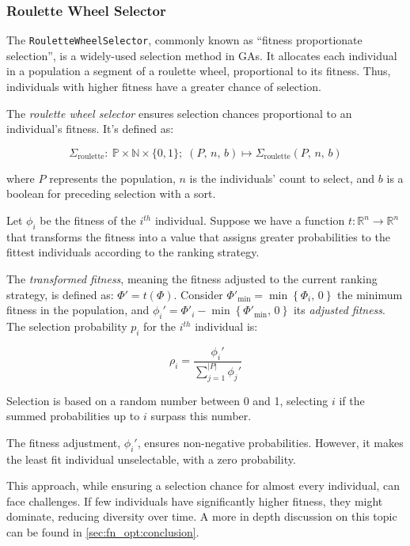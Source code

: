 \subsubsection{Roulette Wheel Selector}
\label{sec:keen:op:select:roulette}
  The \texttt{RouletteWheelSelector}, commonly known as \enquote{fitness 
  proportionate selection}, is a widely-used selection method in GAs.
  It allocates each individual in a population a segment of a roulette wheel, 
  proportional to its fitness.
  Thus, individuals with higher fitness have a greater chance of selection.

  \begin{definition}
    The \emph{roulette wheel selector} ensures selection chances proportional to 
    an individual's fitness.
    It's defined as:

    \begin{equation}
      \Sigma_\mathrm{roulette} :\:
        \mathbb{P} \times \mathbb{N} \times \{0, 1\};\;
      (P,\, n,\, b) \mapsto \Sigma_\mathrm{roulette}(P,\, n,\, b)
    \end{equation}

    where \(P\) represents the population, \(n\) is the individuals' count to 
    select, and \(b\) is a boolean for preceding selection with a sort.

    Let \(\phi_i\) be the fitness of the \(i^{th}\) individual.
    Suppose we have a function \(t : \mathbb{R}^n \to \mathbb{R}^n\) that 
    transforms the fitness into a value that assigns greater probabilities to 
    the fittest individuals according to the ranking strategy.

    The \textit{transformed fitness}, meaning the fitness adjusted to the
    current ranking strategy, is defined as: \(\Phi' = t(\Phi)\).
    Consider \(\Phi'_\mathrm{min} = \min\left\{\Phi_i,\, 0\right\}\) the minimum
    fitness in the population, and \(\phi_i' =  
    \Phi'_i - \min\left\{\Phi'_\mathrm{min},\, 0\right\}\) its \textit{adjusted 
    fitness}.
    The selection probability \(p_i\) for the \(i^{th}\) individual is:

    \begin{equation}
      \rho_i = \frac{\phi_i'}{\sum_{j=1}^{|P|} \phi_j'}
    \end{equation}

    Selection is based on a random number between 0 and 1, selecting \(i\) if 
    the summed probabilities up to \(i\) surpass this number.
  \end{definition}

  \begin{remark}
    The fitness adjustment, \(\phi_i'\), ensures non-negative probabilities. 
    However, it makes the least fit individual unselectable, with a zero 
    probability.
  \end{remark}

  This approach, while ensuring a selection chance for almost every individual, 
  can face challenges.
  If few individuals have significantly higher fitness, they might dominate, 
  reducing diversity over time.
  A more in depth discussion on this topic can be found in 
  \vref{sec:fn_opt:conclusion}.
